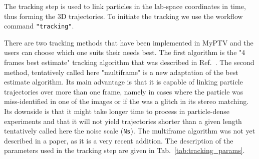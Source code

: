 \documentclass[10pt,a4paper]{article}
\begin{document}
The tracking step is used to link particles in the lab-space coordinates in time, thus forming the 3D trajectories. To initiate the tracking we use the workflow command \texttt{"tracking"}. 

There are two tracking methods that have been implemented in MyPTV and the users can choose which one suits their needs best. The first algorithm is the "4 frames best estimate" tracking algorithm that was described in Ref.~\cite{Ouellette2006}. The second method, tentatively called here "multiframe" is a new adaptation of the best estimate algorithm. Its main advantage is that it is capable of linking particle trajectories over more than one frame, namely in cases where the particle was miss-identified in one of the images or if the was a glitch in its stereo matching. Its downside is that it might take longer time to process in particle-dense experiments and that it will not yield trajectories shorter than a given length tentatively called here the noise scale (\texttt{Ns}). The multiframe algorithm was not yet described in a paper, as it is a very recent addition. The description of the parameters used in the tracking step are given in Tab.~\ref{tab:tracking_params}. 
\end{document}
